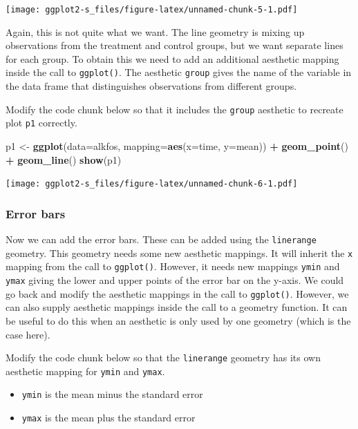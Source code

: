 \documentclass[
]{book}
\newenvironment{Shaded}{\begin{snugshade}}{\end{snugshade}}
\newcommand{\AttributeTok}[1]{\textcolor[rgb]{0.13,0.29,0.53}{#1}}
\newcommand{\FunctionTok}[1]{\textcolor[rgb]{0.13,0.29,0.53}{\textbf{#1}}}
\newcommand{\NormalTok}[1]{#1}
\newcommand{\OtherTok}[1]{\textcolor[rgb]{0.56,0.35,0.01}{#1}}
\newcommand{\SpecialCharTok}[1]{\textcolor[rgb]{0.81,0.36,0.00}{\textbf{#1}}}
\providecommand{\tightlist}{%
  \setlength{\itemsep}{0pt}\setlength{\parskip}{0pt}}
\begin{document}
\texttt{[image: ggplot2-s\_files/figure-latex/unnamed-chunk-5-1.pdf]}

Again, this is not quite what we want. The line geometry is mixing up observations from the treatment and control groups, but we want separate lines for each group. To obtain this we need to add an additional aesthetic mapping inside the call to \texttt{ggplot()}. The aesthetic \texttt{group} gives the name of the variable in the data frame that distinguishes observations from different groups.

Modify the code chunk below so that it includes the \texttt{group} aesthetic to recreate plot \texttt{p1} correctly.

\begin{Shaded}
\begin{Highlighting}[]
\NormalTok{p1 }\OtherTok{\textless{}{-}} \FunctionTok{ggplot}\NormalTok{(}\AttributeTok{data=}\NormalTok{alkfos, }\AttributeTok{mapping=}\FunctionTok{aes}\NormalTok{(}\AttributeTok{x=}\NormalTok{time, }\AttributeTok{y=}\NormalTok{mean)) }\SpecialCharTok{+}
  \FunctionTok{geom\_point}\NormalTok{() }\SpecialCharTok{+} \FunctionTok{geom\_line}\NormalTok{()}
\FunctionTok{show}\NormalTok{(p1)}
\end{Highlighting}
\end{Shaded}

\texttt{[image: ggplot2-s\_files/figure-latex/unnamed-chunk-6-1.pdf]}

\subsubsection{Error bars}\label{error-bars}

Now we can add the error bars. These can be added using the \texttt{linerange} geometry. This geometry needs some new aesthetic mappings. It will inherit the \texttt{x} mapping from the call to \texttt{ggplot()}. However, it needs new mappings \texttt{ymin} and \texttt{ymax} giving the lower and upper points of the error bar on the y-axis. We could go back and modify the aesthetic mappings in the call to \texttt{ggplot()}. However, we can also supply aesthetic mappings inside the call to a geometry function. It can be useful to do this when an aesthetic is only used by one geometry (which is the case here).

Modify the code chunk below so that the \texttt{linerange} geometry has its own aesthetic mapping for \texttt{ymin} and \texttt{ymax}.

\begin{itemize}
\tightlist
\item
  \texttt{ymin} is the mean minus the standard error
\item
  \texttt{ymax} is the mean plus the standard error
\end{itemize}
\end{document}
